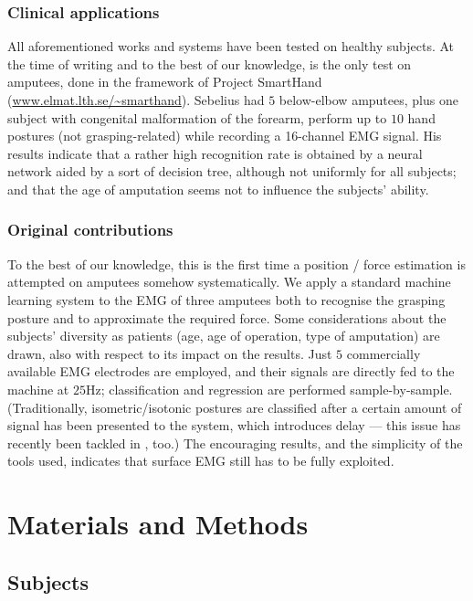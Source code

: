 \documentclass[review,authoryear]{elsarticle}
\renewcommand{\cite}{\citep}
\begin{document}
\subsubsection{Clinical applications}

All aforementioned works and systems have been tested on healthy subjects. At the time
of writing and to the best of our knowledge, \cite{sebelius} is the only test on amputees, done
in the framework of Project SmartHand (\url{www.elmat.lth.se/~smarthand}).
Sebelius had $5$ below-elbow amputees, plus one subject
with congenital malformation of the forearm, perform up to
$10$ hand postures (not grasping-related) while recording a 16-channel EMG signal. His
results indicate that a rather high recognition rate is obtained by a neural network
aided by a sort of decision tree, although not uniformly for all subjects; and that
the age of amputation seems not to influence the subjects' ability.

\subsubsection{Original contributions}

To the best of our knowledge, this is the first time a position / force estimation
is attempted on amputees somehow systematically. We apply a standard machine learning
system to the EMG of three amputees both to recognise the grasping posture and
to approximate the required force. Some considerations about the subjects' diversity
as patients (age, age of operation, type of amputation) are drawn, also with respect to
its impact on the results. Just $5$ commercially available EMG electrodes are
employed, and their signals are directly fed to the machine at $25$Hz;
classification and regression are performed sample-by-sample.
(Traditionally, isometric/isotonic postures are classified after a certain amount
of signal has been presented to the system, which introduces delay --- this issue
has recently been tackled in \cite{tsukamoto}, too.) The encouraging results,
and the simplicity of the tools used, indicates that surface EMG still has to be
fully exploited.

\section{Materials and Methods}
\label{sec:m&ms}

\subsection{Subjects}
\end{document}
